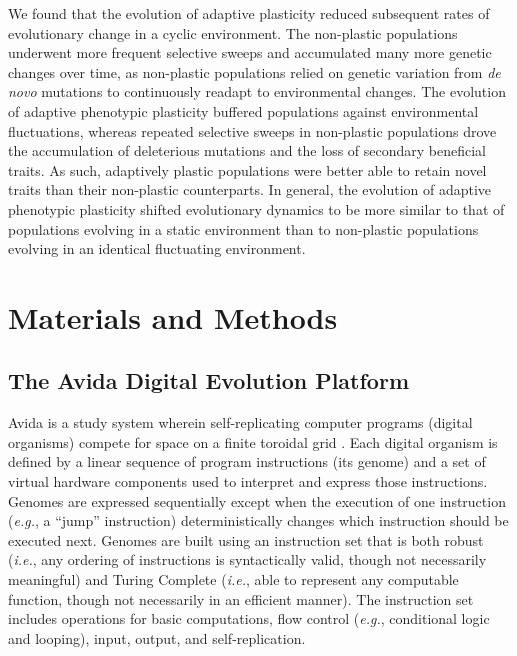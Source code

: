 \documentclass[utf8]{frontiersSCNS} %
\begin{document}
\begin{raggedbottom}
We found that the evolution of adaptive plasticity reduced subsequent rates of evolutionary change in a cyclic environment.
The non-plastic populations underwent more frequent selective sweeps and accumulated many more genetic changes over time, as non-plastic populations relied on genetic variation from \textit{de novo} mutations to continuously readapt to environmental changes.
The evolution of adaptive phenotypic plasticity buffered populations against environmental fluctuations, whereas repeated selective sweeps in non-plastic populations drove the accumulation of deleterious mutations and the loss of secondary beneficial traits. %
As such, adaptively plastic populations were better able to retain novel traits than their non-plastic counterparts.
In general, the evolution of adaptive phenotypic plasticity shifted evolutionary dynamics to be more similar to that of populations evolving in a static environment than to non-plastic populations evolving in an identical fluctuating environment.

\section{Materials and Methods}
\label{sec:methods}

\subsection{The Avida Digital Evolution Platform}
\label{sec:methods:avida}

Avida is a study system wherein self-replicating computer programs (digital organisms) compete for space on a finite toroidal grid \citep{ofria_avida:_2009}.
Each digital organism is defined by a linear sequence of program instructions (its genome) and a set of virtual hardware components used to interpret and express those instructions.
Genomes are expressed sequentially except when the execution of one instruction (\textit{e.g.}, a ``jump'' instruction) deterministically changes which instruction should be executed next.
Genomes are built using an instruction set that is both robust (\textit{i.e.}, any ordering of instructions is syntactically valid, though not necessarily meaningful) and Turing Complete (\textit{i.e.}, able to represent any computable function, though not necessarily in an efficient manner).
The instruction set includes operations for basic computations, flow control (\textit{e.g.}, conditional logic and looping), input, output, and self-replication.


\end{raggedbottom}
\end{document}
